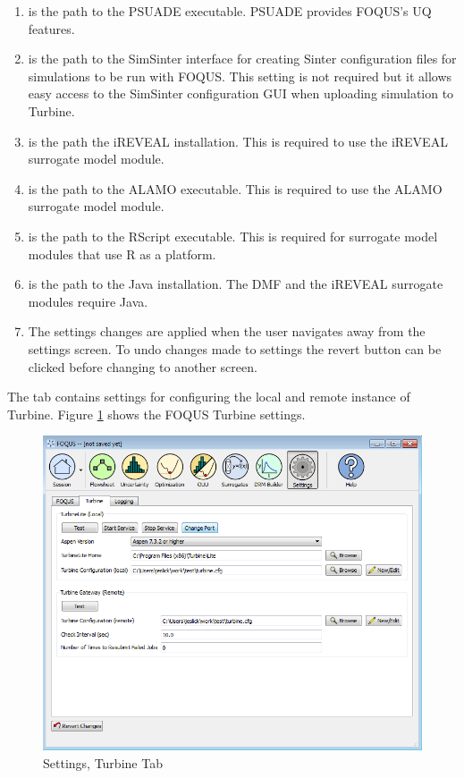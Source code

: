 \begin{enumerate}
	\item {} is the path to the PSUADE executable. PSUADE provides FOQUS's UQ features.
	\item {} is the path to the SimSinter interface for creating Sinter configuration files for simulations to be run with FOQUS. This setting is not required but it allows easy access to the SimSinter configuration GUI when uploading simulation to Turbine.
	\item {} is the path the iREVEAL installation. This is required to use the iREVEAL surrogate model module.
	\item {} is the path to the ALAMO executable. This is required to use the ALAMO surrogate model module.
	\item {} is the path to the RScript executable. This is required for surrogate model modules that use R as a platform.
	\item {} is the path to the Java installation. The DMF and the iREVEAL surrogate modules require Java.
	\item {} The settings changes are applied when the user navigates away from the settings screen. To undo changes made to settings the revert button can be clicked before changing to another screen.
\end{enumerate}


The  tab contains settings for configuring the local and remote instance of Turbine. Figure \ref{fig.settings.turbine} shows the FOQUS Turbine settings.

\begin{figure}[H]
	\begin{center}
		\includegraphics[scale=0.55]{Chapt_flowsheet/figs/settings_turbine}
		\caption{Settings, Turbine Tab}
		\label{fig.settings.turbine}
	\end{center}
\end{figure}

